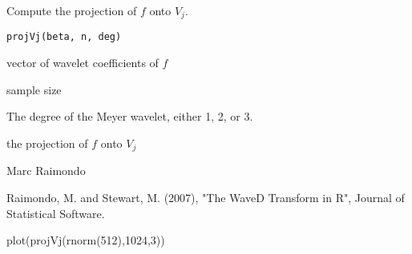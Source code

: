 \documentclass{article}
\begin{document}
\begin{Description}\relax
Compute the projection of $f$ onto $V_j$.
\end{Description}
\begin{Usage}
\begin{verbatim}
projVj(beta, n, deg)
\end{verbatim}
\end{Usage}
\begin{Arguments}
\begin{ldescription}
\item[\code{beta}] vector of wavelet coefficients of $f$
\item[\code{n}] sample size
\item[\code{deg}] The degree of the Meyer wavelet, either 1, 2, or 3.
\end{ldescription}
\end{Arguments}
\begin{Value}
the projection of $f$ onto $V_j$
\end{Value}
\begin{Author}\relax
Marc Raimondo
\end{Author}
\begin{References}\relax
Raimondo, M. and Stewart, M. (2007),
"The WaveD Transform in R", Journal of Statistical Software.
\end{References}
\begin{SeeAlso}\relax
{}
\end{SeeAlso}
\begin{Examples}
\begin{ExampleCode}
 plot(projVj(rnorm(512),1024,3))
\end{ExampleCode}
\end{Examples}
\end{document}
